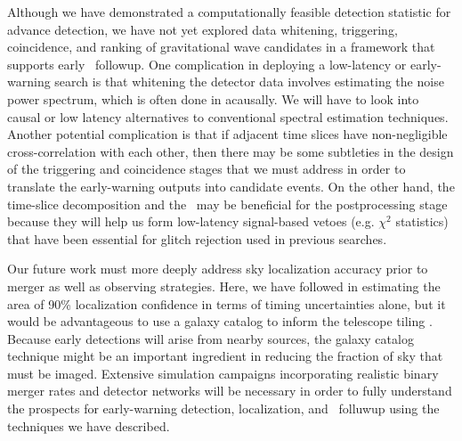 Although we have demonstrated a computationally feasible detection statistic for
advance detection, we have not yet explored data whitening, triggering,
coincidence, and ranking of gravitational wave candidates in a framework that
supports early \EM\ followup.  One complication in deploying a low-latency or
early-warning search is that whitening the detector data involves estimating the
noise power spectrum, which is often done in acausally.  We will have to look into
causal or low latency alternatives to conventional spectral estimation techniques.
Another potential complication is that if adjacent time slices have non-negligible
cross-correlation with each other, then there may be some subtleties in the design
of the triggering and coincidence stages that we must address in order to translate
the early-warning outputs into candidate events.  On the other hand, the time-slice
decomposition and the \SVD\ may be beneficial for the postprocessing stage
because they will help us form low-latency signal-based vetoes (e.g. $\chi^2$ statistics)
that have been essential for glitch rejection used in previous \GW{} \CBC{}
searches.

Our future work must more deeply address sky localization accuracy prior to
merger as well as observing strategies. Here, we have followed
\citet{Fairhurst2009} in estimating the area of 90\% localization confidence in
terms of timing uncertainties alone, but it would be advantageous to use a
galaxy catalog to inform the telescope tiling \citep{galaxy-catalog}. Because
early detections will arise from nearby sources, the galaxy catalog technique
might be an important ingredient in reducing the fraction of sky that must be
imaged.  Extensive simulation campaigns incorporating realistic binary merger
rates and detector networks will be necessary in order to fully understand the
prospects for early-warning detection, localization, and \EM\ folluwup using
the techniques we have described.



